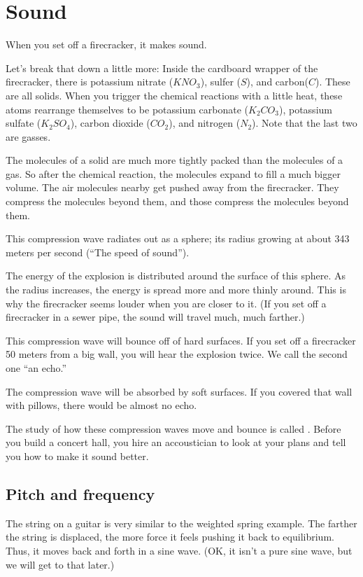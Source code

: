 \chapter{Sound}

When you set off a firecracker, it makes sound.

Let's break that down a little more: Inside the cardboard wrapper of
the firecracker, there is potassium nitrate ($KNO_3$), sulfer ($S$),
and carbon($C$).  These are all solids. When you trigger the chemical
reactions with a little heat, these atoms rearrange themselves to be
potassium carbonate ($K_2CO_3$), potassium sulfate ($K_2SO_4$), carbon
dioxide ($CO_2$), and nitrogen ($N_2$). Note that the last two are
gasses.

The molecules of a solid are much more tightly packed than the
molecules of a gas. So after the chemical reaction, the molecules
expand to fill a much bigger volume. The air molecules nearby get
pushed away from the firecracker.  They compress the molecules beyond
them, and those compress the molecules beyond them.

This compression wave radiates out as a sphere; its radius growing at
about 343 meters per second (``The speed of sound'').

The energy of the explosion is distributed around the surface of this
sphere. As the radius increases, the energy is spread more and more
thinly around. This is why the firecracker seems louder when you are
closer to it. (If you set off a firecracker in a sewer pipe, the sound
will travel much, much farther.)

This compression wave will bounce off of hard surfaces. If you set off
a firecracker 50 meters from a big wall, you will hear the explosion
twice. We call the second one ``an echo.''

The compression wave will be absorbed by soft surfaces. If you covered
that wall with pillows, there would be almost no echo.

The study of how these compression waves move and bounce is called
. Before you build a concert hall, you hire an
accoustician to look at your plans and tell you how to make it sound
better.

\section{Pitch and frequency}

The string on a guitar is very similar to the weighted spring
example. The farther the string is displaced, the more force it feels
pushing it back to equilibrium. Thus, it moves back and forth in a
sine wave. (OK, it isn't a pure sine wave, but we will get to that later.)

